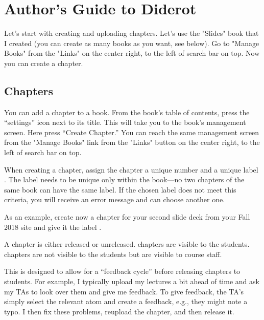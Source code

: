 \chapter{Author's Guide to Diderot}
\label{ch:guide}

%

Let's start with creating and uploading chapters.  Let's use the
"Slides" book that I created (you can create as many books as you
want, see below).  Go to "Manage Books" from the "Links" on the center
right, to the left of search bar on top.  Now you can create a
chapter.  

\section{Chapters}
\label{guide:chapter}

\begin{gram}
\label{guide:chapter::create}
You can add a chapter to a book.  From the book's table of contents, press the ``settings'' icon next to its title.  This will take you to the book's management screen.  Here press ``Create Chapter.''
%
You can reach the same management screen from the "Manage Books" link
from the "Links" button on the center right, to the left of search bar
on top.  

When creating a chapter, assign the chapter a unique number and a unique label .  The label needs to be unique only within the book---no two chapters of the same book can have the same label.
%
If the chosen label does not meet this criteria, you will receive an error message and can choose another one.


As an example, create now a chapter for your second slide deck from
your Fall 2018 site and give it the label .
\end{gram}

\begin{gram}
A chapter is either released or unreleased. 
%
 chapters are visible to the students.
%
 chapters are not visible to the students but  are visible to course staff.  

This is designed to allow for a ``feedback cycle'' before releasing chapters to students.  
%
For example, I typically  upload my lectures a bit ahead of time and ask my TAs to look over them and give me feedback.
%
To give feedback, the TA's simply select the relevant atom and create a feedback, e.g., they might note a typo.
%
I then fix these problems, reupload the chapter, and then release it.  
\end{gram}

